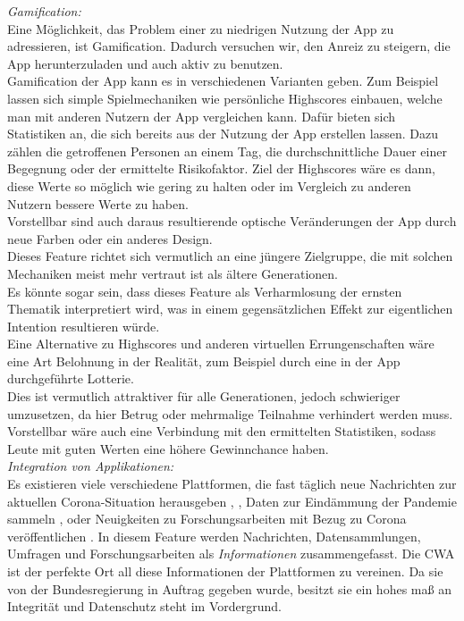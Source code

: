 \documentclass[conference]{IEEEtran}
\begin{document}
\textit{Gamification:}\\
Eine Möglichkeit, das Problem einer zu niedrigen Nutzung der App zu adressieren, ist Gamification. Dadurch versuchen wir, den Anreiz zu steigern, die App herunterzuladen und auch aktiv zu benutzen.\\ 
Gamification der App kann es in verschiedenen Varianten geben. Zum Beispiel lassen sich simple Spielmechaniken wie persönliche Highscores einbauen, welche man mit anderen Nutzern der App vergleichen kann.  Dafür bieten sich Statistiken an, die sich bereits aus der Nutzung der App erstellen lassen. Dazu zählen die getroffenen Personen an einem Tag, die durchschnittliche Dauer einer Begegnung oder der ermittelte Risikofaktor. Ziel der Highscores wäre es dann, diese Werte so möglich wie gering zu halten oder im Vergleich zu anderen Nutzern bessere Werte zu haben.\\
Vorstellbar sind auch daraus resultierende optische Veränderungen der App durch neue Farben oder ein anderes Design.\\
Dieses Feature richtet sich vermutlich an eine jüngere Zielgruppe, die mit solchen Mechaniken meist mehr vertraut ist als ältere Generationen.\\
Es könnte sogar sein, dass dieses Feature als Verharmlosung der ernsten Thematik interpretiert wird, was in einem gegensätzlichen Effekt zur eigentlichen Intention resultieren würde.\\
Eine Alternative zu Highscores und anderen virtuellen Errungenschaften wäre eine Art Belohnung in der Realität, zum Beispiel durch eine in der App durchgeführte Lotterie.\\
Dies ist vermutlich attraktiver für alle Generationen, jedoch schwieriger umzusetzen, da hier Betrug oder mehrmalige Teilnahme verhindert werden muss. Vorstellbar wäre auch eine Verbindung mit den ermittelten Statistiken, sodass Leute mit guten Werten eine höhere Gewinnchance haben.\\

\textit{Integration von Applikationen:}\\
Es existieren viele verschiedene Plattformen, die fast täglich neue Nachrichten zur aktuellen Corona-Situation herausgeben \cite{RKI}, \cite{BMG}, Daten zur Eindämmung der Pandemie sammeln \cite{RKIDatenspende}, \cite{Gedaechtnistest} oder Neuigkeiten zu Forschungsarbeiten mit Bezug zu Corona veröffentlichen \cite{GesundheitsforschungNews}.
In diesem Feature werden Nachrichten, Datensammlungen, Umfragen und Forschungsarbeiten als \textit{Informationen} zusammengefasst.
Die CWA ist der perfekte Ort all diese Informationen der Plattformen zu vereinen. 
Da sie von der Bundesregierung in Auftrag gegeben wurde, besitzt sie ein hohes maß an Integrität und Datenschutz steht im Vordergrund.
\end{document}
